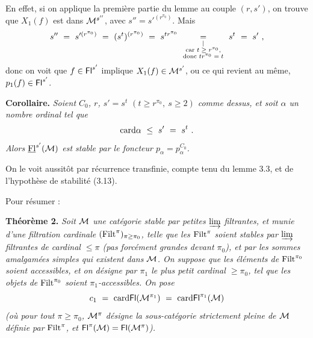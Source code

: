 En effet, si on applique la première partie du lemme au couple $(r,s')$, on trouve que $X_1(f)$ est dans $\mathcal{M}^{s''}$, avec $s''=s'^{(r^{\pi_0})}$. Mais
\[
s''\ =\ s'^{(r^{\pi_0})}\ =\ (s^t)^{(r^{\pi_0})}\ =\ s^{tr^{\pi_0}}\ \underset{\substack{\vert\\ \text{\scriptsize car $t\geq r^{\pi_0}$,}\\ \text{\scriptsize donc $tr^{\pi_0}=t$}}}{=}\ s^t\ =\ s'\ ,
\]
donc on voit que $f\in\mathsf{Fl}^{s'}$ implique $X_1(f)\in\mathcal{M}^{s'}$, ou ce qui revient au même, $p_1(f)\in\mathsf{Fl}^{s'}$.

\textbf{Corollaire.} \textit{Soient $C_0$, $r$, $s'=s^t$ $(t\geq r^{\pi_0},\ s\geq 2)$ comme dessus, et soit $\alpha$ un nombre ordinal tel que}
\[
\card\alpha\ \leq\ s'\ =\ s^t\ .
\]
\textit{Alors $\underline{\mathrm{Fl}}^{s'}(\mathcal{M})$ est stable par le foncteur $p_\alpha=p_\alpha^{C_0}$.}

On le voit aussitôt par récurrence transfinie, compte tenu du lemme 3.3, et de l'hypothèse de stabilité (3.13).

Pour résumer :

\textbf{Théorème 2.} \textit{Soit $\mathcal{M}$ une catégorie stable par petites $\varinjlim$ filtrantes, et munie d'une filtration cardinale} $(\mathrm{Filt}^\pi)_{\pi\geq\pi_0}$\textit{, telle que les} $\mathrm{Filt}^\pi$ \textit{soient stables par $\varinjlim$ filtrantes de cardinal $\leq\pi$ (pas forcément grandes devant $\pi_0$), et par les sommes amalgamées simples qui existent dans $\mathcal{M}$. On suppose que les éléments de} $\mathrm{Filt}^{\pi_0}$ \textit{soient accessibles, et on désigne par $\pi_1$ le plus petit cardinal $\geq\pi_0$, tel que les objets de} $\mathrm{Filt}^{\pi_0}$ \textit{soient $\pi_1$-accessibles. On pose} 
\[
c_1\ =\ \card\Fl(\M^{\pi_1})\ =\ \card\Fl^{\pi_1}(\M)
\]
\textit{(où pour tout $\pi\geq\pi_0$, $\mathcal{M}^\pi$ désigne la sous-catégorie strictement pleine de $\mathcal{M}$ définie par} $\mathrm{Filt}^\pi$\textit{, et} $\mathsf{Fl}^\pi(\mathcal{M})=\mathsf{Fl}(\mathcal{M}^\pi)$\textit{).}

